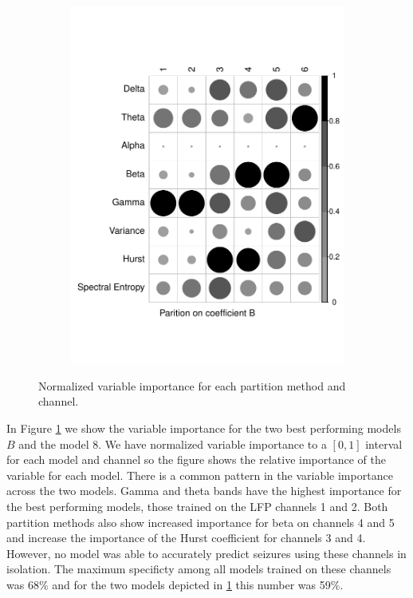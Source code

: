 \begin{figure}[h]
\begin{subfigure}[b]{0.45\textwidth}
    \includegraphics[width = \linewidth, keepaspectratio]{./figs/eeg-AB-corrplot.pdf}%
      \end{subfigure}
  \caption{Normalized variable importance for
     each partition method and channel.}
    \label{fig:corrplot}
\end{figure}

In Figure \ref{fig:corrplot} we show the variable 
importance for the two best performing models $B$ and the 
model $8$. We have normalized variable importance to a $[0,1]$ interval for each model and
channel so the figure shows the relative importance of the variable for each model. There is a common pattern in the variable importance across the two models. Gamma and theta bands have the highest importance for the best performing models, those trained on the LFP channels 1 and 2. Both partition methods also show increased importance for beta on channels 4 and 5 and increase the importance of the Hurst coefficient for channels 3 and 4. However, no model 
was able to accurately predict seizures using these channels 
in isolation. The maximum specificty among all models trained 
on these channels was 68\% and for the two models depicted 
in \ref{fig:corrplot} this number was 59\%. 

